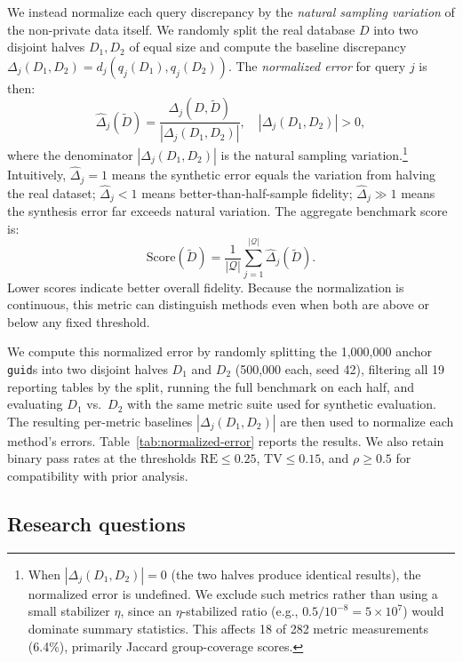 \documentclass[12pt,letterpaper]{article}
\renewcommand{\_}{\textunderscore\allowbreak}
\begin{document}
We instead normalize each query discrepancy by the \emph{natural sampling variation} of the non-private data itself. We randomly split the real database $D$ into two disjoint halves $D_1, D_2$ of equal size and compute the baseline discrepancy $\Delta_j(D_1, D_2) = d_j(q_j(D_1), q_j(D_2))$. The \textit{normalized error} for query $j$ is then:
\begin{equation}
    \label{eq:normalized-error}
    \hat{\Delta}_j(\tilde{D}) = \frac{\Delta_j(D, \tilde{D})}{|\Delta_j(D_1, D_2)|}, \quad |\Delta_j(D_1, D_2)| > 0,
\end{equation}
where the denominator $|\Delta_j(D_1, D_2)|$ is the natural sampling variation.\footnote{When $|\Delta_j(D_1, D_2)| = 0$ (the two halves produce identical results), the normalized error is undefined. We exclude such metrics rather than using a small stabilizer $\eta$, since an $\eta$-stabilized ratio (e.g., $0.5/10^{-8} = 5 \times 10^7$) would dominate summary statistics. This affects 18 of 282 metric measurements (6.4\%), primarily Jaccard group-coverage scores.} Intuitively, $\hat{\Delta}_j = 1$ means the synthetic error equals the variation from halving the real dataset; $\hat{\Delta}_j < 1$ means better-than-half-sample fidelity; $\hat{\Delta}_j \gg 1$ means the synthesis error far exceeds natural variation. The aggregate benchmark score is:
\begin{equation}
    \text{Score}(\tilde{D}) = \frac{1}{|\mathcal{Q}|} \sum_{j=1}^{|\mathcal{Q}|} \hat{\Delta}_j(\tilde{D}).
\end{equation}
Lower scores indicate better overall fidelity. Because the normalization is continuous, this metric can distinguish methods even when both are above or below any fixed threshold.

We compute this normalized error by randomly splitting the 1{,}000{,}000 anchor \texttt{guid}s into two disjoint halves $D_1$ and $D_2$ (500{,}000 each, seed 42), filtering all 19 reporting tables by the split, running the full benchmark on each half, and evaluating $D_1$ vs.\ $D_2$ with the same metric suite used for synthetic evaluation. The resulting per-metric baselines $|\Delta_j(D_1, D_2)|$ are then used to normalize each method's errors. Table~\ref{tab:normalized-error} reports the results. We also retain binary pass rates at the thresholds $\text{RE} \leq 0.25$, $\text{TV} \leq 0.15$, and $\rho \geq 0.5$ for compatibility with prior analysis.

\subsection{Research questions}
\label{sec:research-questions}
\end{document}
